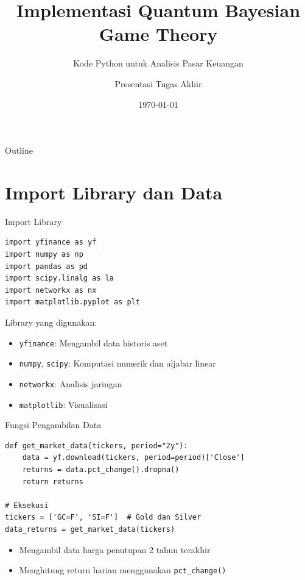 \documentclass[aspectratio=169]{beamer}
\title{Implementasi Quantum Bayesian Game Theory}
\subtitle{Kode Python untuk Analisis Pasar Keuangan}
\author{Presentasi Tugas Akhir}
\date{\today}
\begin{document}
\begin{frame}
    \titlepage
\end{frame}

\begin{frame}{Outline}
    \tableofcontents
\end{frame}

\section{Import Library dan Data}

\begin{frame}[fragile]{Import Library}
\begin{lstlisting}
import yfinance as yf
import numpy as np
import pandas as pd
import scipy.linalg as la
import networkx as nx
import matplotlib.pyplot as plt
\end{lstlisting}

\vspace{0.3cm}
Library yang digunakan:
\begin{itemize}
    \item \texttt{yfinance}: Mengambil data historis aset
    \item \texttt{numpy}, \texttt{scipy}: Komputasi numerik dan aljabar linear
    \item \texttt{networkx}: Analisis jaringan
    \item \texttt{matplotlib}: Visualisasi
\end{itemize}
\end{frame}

\begin{frame}[fragile]{Fungsi Pengambilan Data}
\begin{lstlisting}
def get_market_data(tickers, period="2y"):
    data = yf.download(tickers, period=period)['Close']
    returns = data.pct_change().dropna()
    return returns

# Eksekusi
tickers = ['GC=F', 'SI=F']  # Gold dan Silver
data_returns = get_market_data(tickers)
\end{lstlisting}

\vspace{0.3cm}
\begin{itemize}
    \item Mengambil data harga penutupan 2 tahun terakhir
    \item Menghitung return harian menggunakan \texttt{pct\_change()}
\end{itemize}
\end{frame}
\end{document}
